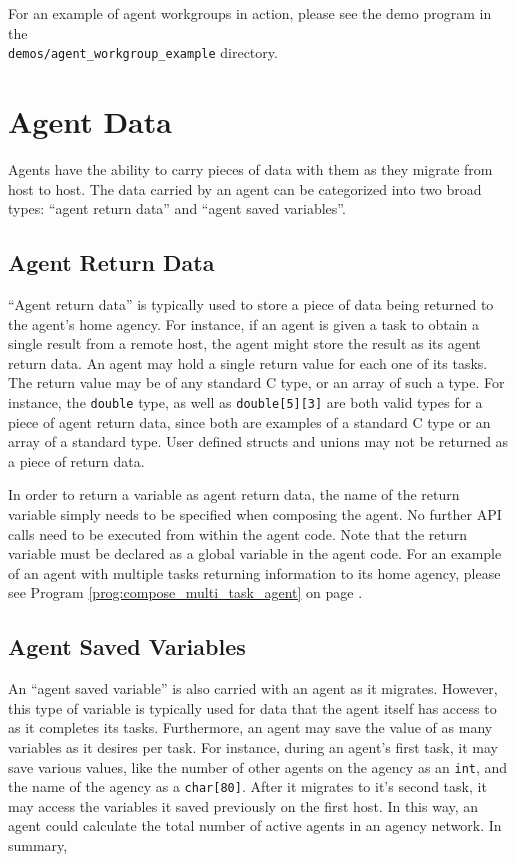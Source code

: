 \documentclass[11pt]{report}
\begin{document}
For an example of agent workgroups in action, please see the demo program
in the\\
 \texttt{demos/agent\_workgroup\_example} directory. 


\chapter{Agent Data}
Agents have the ability to carry pieces of data with them as they migrate from
host to host. The data carried by an agent can be categorized into two broad
types: ``agent return data'' and ``agent saved variables''. 

\section{Agent Return Data}
  ``Agent return data'' is typically used to store a piece of data being
returned to the agent's home agency. For instance, if an agent is given a task
to obtain a single result from a remote host, the agent might store the result
as its agent return data. An agent may hold a single return value for each one
of its tasks. The return value may be of any standard C type, or an array of 
such a type. For instance, the \texttt{double} type, as well as
\texttt{double[5][3]} are both valid types for a piece of agent return data,
since both are examples of a standard C type or an array of a standard type.
User defined structs and unions may not be returned as a piece of return data.
 
In order to return a variable as agent return data, the name of the return variable
simply needs to be specified when composing the agent. No further API calls need to be
executed from within the agent code. Note that the return variable must be declared as
a global variable in the agent code.
For an example of an agent with multiple tasks returning information to its home agency,
please see Program \ref{prog:compose_multi_task_agent} on page
\pageref{prog:compose_multi_task_agent}.

\section{Agent Saved Variables} 
An ``agent saved variable'' is also carried with an agent as it migrates. However,
this type of variable is typically used for data that the agent itself has access
to as it completes its tasks. Furthermore, an agent may save the value of as many
variables as it desires per task. For instance, during an agent's first task, it
may save various values, like the number of other agents on the agency as an
\texttt{int}, and the name of the agency as a \texttt{char[80]}. After it
migrates to it's second task, it may access the variables it saved previously
on the first host. In this way, an agent could calculate the total number of
active agents in an agency network. In summary,
\end{document}
